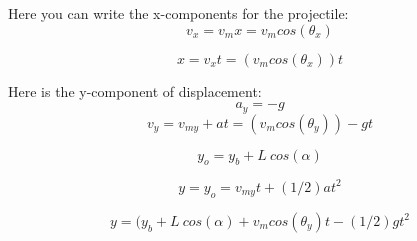 \documentclass{article}
\begin{document}
{\Large



Here you can write the x-components for the projectile:
\begin{equation}
  v_x = v_mx = v_m cos(\theta_x)
\end{equation}

\begin{equation}
  x = v_xt = (v_m cos(\theta_x))t
\end{equation}

Here is the y-component of displacement:
\begin{equation}
  a_y = -g
\end{equation}
\begin{equation}
  v_y = v_{my} + at = (v_m cos(\theta_y)) - gt
\end{equation}

\begin{equation}
y_o = y_b + L\: cos(\alpha)
\end{equation}

\begin{equation}
y = y_o = v_{my}t + (1/2)at^2
\end{equation}

\begin{equation}
y = (y_b + L\: cos(\alpha) + v_m cos(\theta_y)t - (1/2)gt^2
\end{equation}

}
\end{document}
